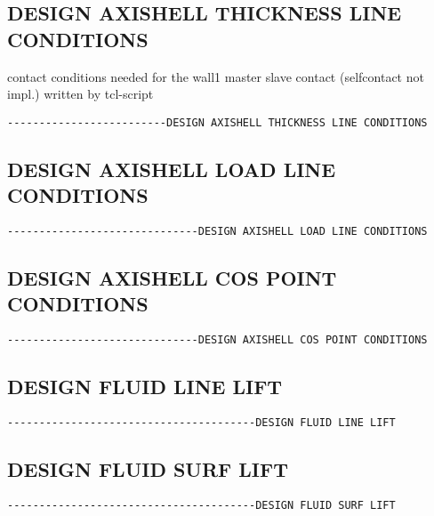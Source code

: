 
\subsection{DESIGN AXISHELL THICKNESS LINE CONDITIONS}
contact conditions needed for the wall1  master slave contact (selfcontact not impl.) written by tcl-script
\begin{verbatim}
-------------------------DESIGN AXISHELL THICKNESS LINE CONDITIONS
\end{verbatim}


\subsection{DESIGN AXISHELL LOAD LINE CONDITIONS}
\begin{verbatim}
------------------------------DESIGN AXISHELL LOAD LINE CONDITIONS
\end{verbatim}


\subsection{DESIGN AXISHELL COS POINT CONDITIONS}
\begin{verbatim}
------------------------------DESIGN AXISHELL COS POINT CONDITIONS
\end{verbatim}


\subsection{DESIGN FLUID LINE LIFT}
\begin{verbatim}
---------------------------------------DESIGN FLUID LINE LIFT
\end{verbatim}

\subsection{DESIGN FLUID SURF LIFT}
\begin{verbatim}
---------------------------------------DESIGN FLUID SURF LIFT
\end{verbatim}

